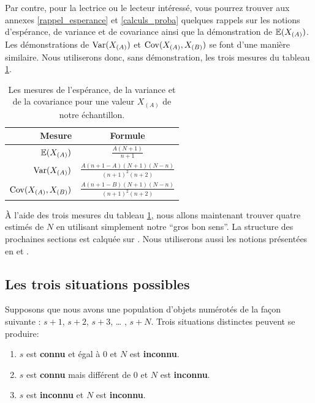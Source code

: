 \documentclass[10pt]{article}
\begin{document}
Par contre, pour la lectrice ou le lecteur intéressé, vous pourrez
trouver aux annexes \ref{rappel_esperance} et \ref{calculs_proba}
quelques rappels sur les notions d'espérance, de variance et de
covariance ainsi que la démonstration de \(\operatorname{\mathbb{E}}(X_{(A)})\). Les
démonstrations de \(\operatorname{Var}(X_{(A)})\) et \(\operatorname{Cov}(X_{(A)},X_{(B)})\) se font
d'une manière similaire. Nous utiliserons donc, sans démonstration, les
trois mesures du tableau \ref{tab:mesures_stat}.

\begin{table}[ht]
\begin{center}
\begin{tabular}{|r|c|}
\hline
Mesure & Formule \\
\hline
\hline
$\operatorname{\mathbb{E}} (X_{(A)})$ & $\frac{A(N+1)}{n+1}$ \\ 
\hline
$\operatorname{Var}(X_{(A)})$ & $\frac{A(n+1-A)(N+1)(N-n)}{(n+1)^2(n+2)}$ \\
\hline
$\operatorname{Cov}(X_{(A)},X_{(B)})$ & $\frac{A(n+1-B)(N+1)(N-n)}{(n+1)^2(n+2)}$ \\
\hline
\end{tabular}
\end{center}
\caption{\label{tab:mesures_stat} {Les mesures de l'espérance, de la variance et de la covariance pour une valeur $X_{(A)}$ de notre échantillon.} }
\end{table}

À l'aide des trois mesures du tableau \ref{tab:mesures_stat}, nous
allons maintenant trouver quatre estimés de \(N\) en utilisant
simplement notre ``gros bon sens''. La structure des prochaines sections
est calquée sur \cite{Johnson}. Nous utiliserons aussi les notions
présentées en \cite{Goodman1952} et \cite{Goodman1954}.

\hypertarget{les-trois-situations-possibles}{%
\subsection{Les trois situations
possibles}\label{les-trois-situations-possibles}}

Supposons que nous avons une population d'objets numérotés de la façon
suivante : \(s+1\), \(s+2\), \(s+3\), \ldots{} , \(s+N\). Trois
situations distinctes peuvent se produire:

\begin{enumerate}
\def\labelenumi{\arabic{enumi}.}
\item
  \(s\) est \textbf{connu} et égal à \(0\) et \(N\) est
  \textbf{inconnu}.
\item
  \(s\) est \textbf{connu} mais différent de \(0\) et \(N\) est
  \textbf{inconnu}.
\item
  \(s\) est \textbf{inconnu} et \(N\) est \textbf{inconnu}.
\end{enumerate}
\end{document}
